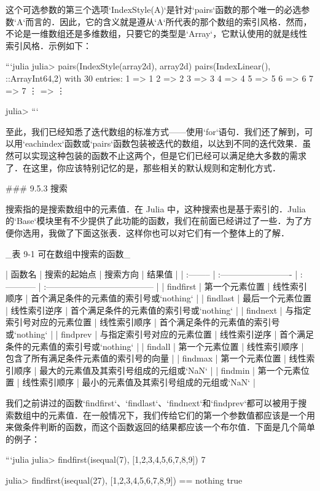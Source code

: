 这个可选参数的第三个选项`IndexStyle(A)`是针对`pairs`函数的那个唯一的必选参数`A`而言的．因此，它的含义就是遵从`A`所代表的那个数组的索引风格．然而，不论是一维数组还是多维数组，只要它的类型是`Array`，它默认使用的就是线性索引风格．示例如下：

```julia
julia> pairs(IndexStyle(array2d), array2d)
pairs(IndexLinear(), ::Array{Int64,2}) with 30 entries:
  1 => 1
  2 => 2
  3 => 3
  4 => 4
  5 => 5
  6 => 6
  7 => 7
  ⋮ => ⋮

julia> 
```

至此，我们已经知悉了迭代数组的标准方式——使用`for`语句．我们还了解到，可以用`eachindex`函数或`pairs`函数包装被迭代的数组，以达到不同的迭代效果．虽然可以实现这种包装的函数不止这两个，但是它们已经可以满足绝大多数的需求了．在这里，你应该特别记忆的是，那些相关的默认规则和定制化方式．

### 9.5.3 搜索

搜索指的是搜索数组中的元素值．在 Julia 中，这种搜索也是基于索引的．Julia 的`Base`模块里有不少提供了此功能的函数，我们在前面已经讲过了一些．为了方便你选用，我做了下面这张表．这样你也可以对它们有一个整体上的了解．

_表 9-1 可在数组中搜索的函数_

| 函数名    | 搜索的起始点               | 搜索方向     | 结果值                                  |
| :-------- | :------------------------- | :----------- | :-------------------------------------- |
| findfirst | 第一个元素位置             | 线性索引顺序 | 首个满足条件的元素值的索引号或`nothing` |
| findlast  | 最后一个元素位置           | 线性索引逆序 | 首个满足条件的元素值的索引号或`nothing` |
| findnext  | 与指定索引号对应的元素位置 | 线性索引顺序 | 首个满足条件的元素值的索引号或`nothing` |
| findprev  | 与指定索引号对应的元素位置 | 线性索引逆序 | 首个满足条件的元素值的索引号或`nothing` |
| findall   | 第一个元素位置             | 线性索引顺序 | 包含了所有满足条件元素值的索引号的向量  |
| findmax   | 第一个元素位置             | 线性索引顺序 | 最大的元素值及其索引号组成的元组或`NaN` |
| findmin   | 第一个元素位置             | 线性索引顺序 | 最小的元素值及其索引号组成的元组或`NaN` |

我们之前讲过的函数`findfirst`、`findlast`、`findnext`和`findprev`都可以被用于搜索数组中的元素值．在一般情况下，我们传给它们的第一个参数值都应该是一个用来做条件判断的函数，而这个函数返回的结果都应该一个布尔值．下面是几个简单的例子：

```julia
julia> findfirst(isequal(7), [1,2,3,4,5,6,7,8,9])
7

julia> findfirst(isequal(27), [1,2,3,4,5,6,7,8,9]) == nothing
true

